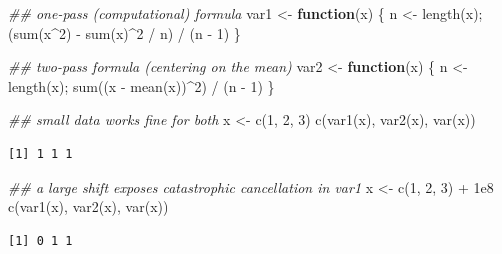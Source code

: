 \documentclass[
  letterpaper,
  DIV=11,
  numbers=noendperiod]{scrreprt}
\newenvironment{Shaded}{\begin{snugshade}}{\end{snugshade}}
\newcommand{\ControlFlowTok}[1]{\textcolor[rgb]{0.00,0.23,0.31}{\textbf{#1}}}
\newcommand{\DecValTok}[1]{\textcolor[rgb]{0.68,0.00,0.00}{#1}}
\newcommand{\DocumentationTok}[1]{\textcolor[rgb]{0.37,0.37,0.37}{\textit{#1}}}
\newcommand{\FloatTok}[1]{\textcolor[rgb]{0.68,0.00,0.00}{#1}}
\newcommand{\FunctionTok}[1]{\textcolor[rgb]{0.28,0.35,0.67}{#1}}
\newcommand{\NormalTok}[1]{\textcolor[rgb]{0.00,0.23,0.31}{#1}}
\newcommand{\OtherTok}[1]{\textcolor[rgb]{0.00,0.23,0.31}{#1}}
\newcommand{\SpecialCharTok}[1]{\textcolor[rgb]{0.37,0.37,0.37}{#1}}
\begin{document}
\begin{Shaded}
\begin{Highlighting}[]
\DocumentationTok{\#\# one{-}pass (computational) formula}
\NormalTok{var1 }\OtherTok{\textless{}{-}} \ControlFlowTok{function}\NormalTok{(x) \{ n }\OtherTok{\textless{}{-}} \FunctionTok{length}\NormalTok{(x); (}\FunctionTok{sum}\NormalTok{(x}\SpecialCharTok{\^{}}\DecValTok{2}\NormalTok{) }\SpecialCharTok{{-}} \FunctionTok{sum}\NormalTok{(x)}\SpecialCharTok{\^{}}\DecValTok{2} \SpecialCharTok{/}\NormalTok{ n) }\SpecialCharTok{/}\NormalTok{ (n }\SpecialCharTok{{-}} \DecValTok{1}\NormalTok{) \}}

\DocumentationTok{\#\# two{-}pass formula (centering on the mean)}
\NormalTok{var2 }\OtherTok{\textless{}{-}} \ControlFlowTok{function}\NormalTok{(x) \{ n }\OtherTok{\textless{}{-}} \FunctionTok{length}\NormalTok{(x); }\FunctionTok{sum}\NormalTok{((x }\SpecialCharTok{{-}} \FunctionTok{mean}\NormalTok{(x))}\SpecialCharTok{\^{}}\DecValTok{2}\NormalTok{) }\SpecialCharTok{/}\NormalTok{ (n }\SpecialCharTok{{-}} \DecValTok{1}\NormalTok{) \}}

\DocumentationTok{\#\# small data works fine for both}
\NormalTok{x }\OtherTok{\textless{}{-}} \FunctionTok{c}\NormalTok{(}\DecValTok{1}\NormalTok{, }\DecValTok{2}\NormalTok{, }\DecValTok{3}\NormalTok{)}
\FunctionTok{c}\NormalTok{(}\FunctionTok{var1}\NormalTok{(x), }\FunctionTok{var2}\NormalTok{(x), }\FunctionTok{var}\NormalTok{(x))}
\end{Highlighting}
\end{Shaded}

\begin{verbatim}
[1] 1 1 1
\end{verbatim}

\begin{Shaded}
\begin{Highlighting}[]
\DocumentationTok{\#\# a large shift exposes catastrophic cancellation in var1}
\NormalTok{x }\OtherTok{\textless{}{-}} \FunctionTok{c}\NormalTok{(}\DecValTok{1}\NormalTok{, }\DecValTok{2}\NormalTok{, }\DecValTok{3}\NormalTok{) }\SpecialCharTok{+} \FloatTok{1e8}
\FunctionTok{c}\NormalTok{(}\FunctionTok{var1}\NormalTok{(x), }\FunctionTok{var2}\NormalTok{(x), }\FunctionTok{var}\NormalTok{(x))}
\end{Highlighting}
\end{Shaded}

\begin{verbatim}
[1] 0 1 1
\end{verbatim}
\end{document}
